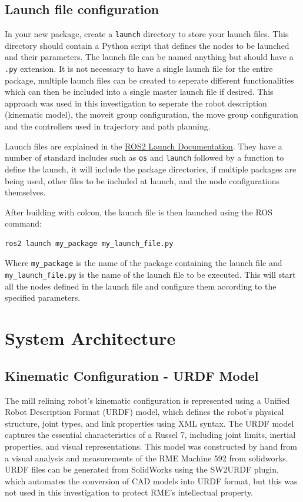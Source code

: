 \documentclass[10pt,a4paper,english]{article}
\begin{document}
\subsection{Launch file configuration}
In your new package, create a \texttt{launch} directory to store your launch files. This directory should contain a Python script that defines the nodes to be launched and their parameters. The launch file can be named anything but should have a \texttt{.py} extension. It is not necessary to have a single launch file for the entire package, multiple launch files can be created to seperate different functionalities which can then be included into a single master launch file if desired. This approach was used in this investigation to seperate the robot description (kinematic model), the moveit group configuration, the move group configuration and the controllers used in trajectory and path planning.

Launch files are explained in the \href{https://docs.ros.org/en/kilted/Tutorials/Intermediate/Launch/Creating-Launch-Files.html}{ROS2 Launch Documentation}. They have a number of standard includes such as \texttt{os} and \texttt{launch} followed by a function to define the launch, it will include the package directories, if multiple packages are being used, other files to be included at launch, and the node configurations themselves. 

After building with colcon, the launch file is then launched using the ROS command:
\begin{lstlisting}
ros2 launch my_package my_launch_file.py
\end{lstlisting}
Where \texttt{my\_package} is the name of the package containing the launch file and \texttt{my\_launch\_file.py} is the name of the launch file to be executed. This will start all the nodes defined in the launch file and configure them according to the specified parameters.

\newpage



\section{System Architecture}
\subsection{Kinematic Configuration - URDF Model}
The mill relining robot's kinematic configuration is represented using a Unified Robot Description Format (URDF) model, which defines the robot's physical structure, joint types, and link properties using XML syntax. The URDF model captures the essential characteristics of a Russel 7, including joint limits, inertial properties, and visual representations. This model was constructed by hand from a visual analysis and measurements of the RME Machine 592 from solidworks. URDF files can be generated from SolidWorks using the SW2URDF plugin, which automates the conversion of CAD models into URDF format, but this was not used in this investigation to protect RME's intellectual property.
\end{document}
